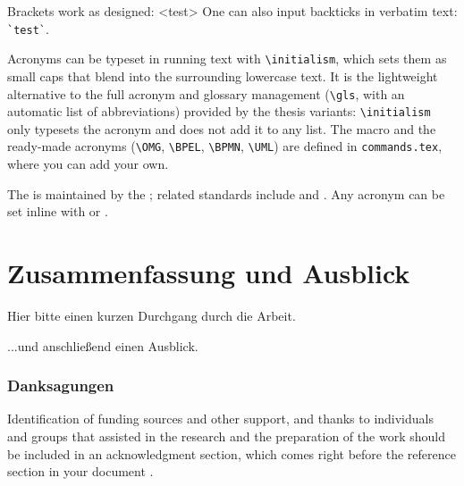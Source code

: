 \begin{ltgexample}
Brackets work as designed:
<test>
One can also input backticks in verbatim text: \verb|`test`|.
\end{ltgexample}

Acronyms can be typeset in running text with \verb+\initialism+, which sets them as small caps that blend into the surrounding lowercase text. It is the lightweight alternative to the full acronym and glossary management (\verb+\gls+, with an automatic list of abbreviations) provided by the thesis variants: \verb+\initialism+ only typesets the acronym and does not add it to any list. The macro and the ready-made acronyms (\verb+\OMG+, \verb+\BPEL+, \verb+\BPMN+, \verb+\UML+) are defined in \texttt{commands.tex}, where you can add your own.

\begin{ltgexample}
The \UML is maintained by the \OMG; related standards include \BPEL and \BPMN.
Any acronym can be set inline with  or .
\end{ltgexample}


\section{Zusammenfassung und Ausblick}
\label{sec:outlook}
Hier bitte einen kurzen Durchgang durch die Arbeit.

\lipsum[1-2]

...und anschließend einen Ausblick.

\subsubsection*{Danksagungen}

Identification of funding sources and other support, and thanks to individuals and groups that assisted in the research and the preparation of the work should be included in an acknowledgment section, which comes right before the reference section in your document \cite{acmart}.


\renewcommand{\bibsection}{\section*{Literatur}} %

\begingroup
  \small %
  
\endgroup

